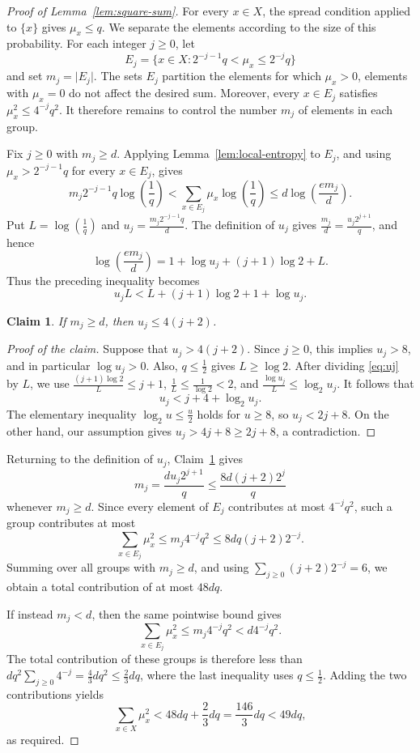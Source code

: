\documentclass[10pt,a4paper]{amsart}
\newtheorem{claim}[theorem]{Claim}
\newenvironment{poc}{\begin{proof}[Proof of the claim]\renewcommand*{\qedsymbol}{\(\blacksquare\)}}{\end{proof}}
\newcommand*{\abs}[1]{\lvert#1\rvert}
\begin{document}
\begin{proof}[Proof of Lemma~\ref{lem:square-sum}]
For every \(x\in X\), the spread condition applied to \(\{x\}\) gives \(\mu_{x}\le q\). We separate the elements according to the size of this probability. For each integer \(j\ge 0\), let
\[
E_{j}=\{x\in X:2^{-j-1}q<\mu_{x}\le 2^{-j}q\}
\]
and set \(m_{j}=\abs{E_{j}}\). The sets \(E_{j}\) partition the elements for which \(\mu_{x}>0\), elements with \(\mu_{x}=0\) do not affect the desired sum. Moreover, every \(x\in E_{j}\) satisfies \(\mu_{x}^{2}\le 4^{-j}q^{2}\). It therefore remains to control the number \(m_{j}\) of elements in each group.

Fix \(j\ge 0\) with \(m_{j}\ge d\). Applying Lemma~\ref{lem:local-entropy} to \(E_{j}\), and using \(\mu_{x}>2^{-j-1}q\) for every \(x\in E_{j}\), gives
\[
m_{j}2^{-j-1}q\log\left(\frac{1}{q}\right)
<\sum_{x\in E_{j}}\mu_{x}\log\left(\frac{1}{q}\right)
\le d\log\left(\frac{em_{j}}{d}\right).
\]
Put \(L=\log\left(\frac{1}{q}\right)\) and \(u_{j}=\frac{m_{j}2^{-j-1}q}{d}\). The definition of \(u_{j}\) gives \(\frac{m_{j}}{d}=\frac{u_{j}2^{j+1}}{q}\), and hence
\[
\log\left(\frac{em_{j}}{d}\right)=1+\log u_{j}+(j+1)\log 2+L.
\]
Thus the preceding inequality becomes
\begin{equation}\label{eq:uj}
u_{j}L<L+(j+1)\log 2+1+\log u_{j}.
\end{equation}

\begin{claim}\label{claim:uj}
If \(m_{j}\ge d\), then \(u_{j}\le 4(j+2)\).
\end{claim}

\begin{poc}
Suppose that \(u_{j}>4(j+2)\). Since \(j\ge 0\), this implies \(u_{j}>8\), and in particular \(\log u_{j}>0\). Also, \(q\le\frac{1}{2}\) gives \(L\ge\log 2\). After dividing \eqref{eq:uj} by \(L\), we use \(\frac{(j+1)\log 2}{L}\le j+1\), \(\frac{1}{L}\le\frac{1}{\log 2}<2\), and \(\frac{\log u_{j}}{L}\le\log_{2}u_{j}\). It follows that
\[
u_{j}<j+4+\log_{2}u_{j}.
\]
The elementary inequality \(\log_{2}u\le\frac{u}{2}\) holds for \(u\ge 8\), so \(u_{j}<2j+8\). On the other hand, our assumption gives \(u_{j}>4j+8\ge 2j+8\), a contradiction.
\end{poc}

Returning to the definition of \(u_{j}\), Claim~\ref{claim:uj} gives
\[
m_{j}=\frac{du_{j}2^{j+1}}{q}\le \frac{8d(j+2)2^{j}}{q}
\]
whenever \(m_{j}\ge d\). Since every element of \(E_{j}\) contributes at most \(4^{-j}q^{2}\), such a group contributes at most
\[
\sum_{x\in E_{j}}\mu_{x}^{2}\le m_{j}4^{-j}q^{2}\le 8dq(j+2)2^{-j}.
\]
Summing over all groups with \(m_{j}\ge d\), and using \(\sum_{j\ge 0}(j+2)2^{-j}=6\), we obtain a total contribution of at most \(48dq\).

If instead \(m_{j}<d\), then the same pointwise bound gives
\[
\sum_{x\in E_{j}}\mu_{x}^{2}\le m_{j}4^{-j}q^{2}<d4^{-j}q^{2}.
\]
The total contribution of these groups is therefore less than \(dq^{2}\sum_{j\ge 0}4^{-j}=\frac{4}{3}dq^{2}\le\frac{2}{3}dq\), where the last inequality uses \(q\le\frac{1}{2}\). Adding the two contributions yields
\[
\sum_{x\in X}\mu_{x}^{2}<48dq+\frac{2}{3}dq=\frac{146}{3}dq<49dq,
\]
as required.
\end{proof}
\end{document}
